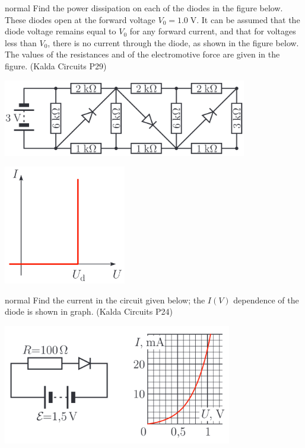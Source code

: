 \hypertarget{P35}{}
\begin{solution}{normal} %
Find the power dissipation on each of the diodes in the figure below. These diodes open at the forward voltage $V_0=1.0\;\text{V}$. It can be assumed that the diode voltage remains equal to $V_0$ for any forward current, and that for voltages less than $V_0$, there is no current through the diode, as shown in the figure below. The values of the resistances and of the electromotive force are given in the figure. (Kalda Circuits P29)
\begin{center}
    \includegraphics[width=0.8\textwidth]{S1 Figures/S1-35-1.png}
\end{center}
\begin{center}
    \includegraphics[width=0.4\textwidth]{S1 Figures/S1-35-2.png}
\end{center}
\end{solution}

\hypertarget{P36}{}
\begin{solution}{normal} %
Find the current in the circuit given below; the $I(V)$ dependence of the diode is shown in graph. (Kalda Circuits P24)
\begin{center}
    \includegraphics[width=0.75\textwidth]{S1 Figures/S1-36.png}
\end{center}
\end{solution}

